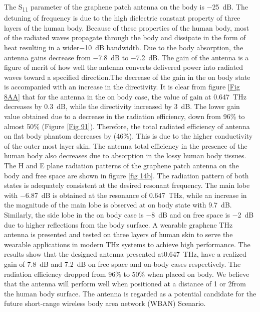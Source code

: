 \documentclass[12pt]{suhbook}
\begin{document}
The \si{S_{11}} parameter of the graphene patch antenna on the body is \SI{-25}{\deci\bel}. The detuning of frequency is due to the high dielectric constant property of three layers of the human body. Because of these properties of the human body, most of the radiated waves propagate through the body and dissipate in the form of heat resulting in a wider\SI{-10}{\deci\bel} bandwidth. Due to the body absorption, the antenna gains decrease from \SI{-7.8}{\deci\bel}  to \SI{-7.2}{\deci\bel}. The gain of the antenna is a figure of merit of how well the antenna converts delivered power into radiated waves toward a specified direction.The decrease of the gain in the on body state is accompanied with an increase in the directivity. It is clear from figure \ref{Fig 8AA}  that for the antenna in the on body case, the value of gain at \SI{0.647}{\THz} decreases by \SI{0.3}{\deci\bel}, while the directivity increased by \SI{3}{\deci\bel}. The lower gain value obtained due to a decrease in the radiation efficiency, down from 96\% to almost 50\% (Figure \ref{Fig 91}). Therefore, the total radiated efficiency of antenna on flat body phantom decreases by (46\%). This is due to the higher conductivity of the outer most layer skin. The antenna total efficiency in the presence of the human body also decreases due to absorption in the lossy human body tissues. 
\\The H and E plane radiation patterns of the graphene patch antenna on the body and free space are shown in figure \ref{fig 14b}. The radiation pattern of both states is adequately consistent at the desired resonant frequency. The main lobe with \SI{-6.87}{\deci\bel} is obtained at the resonance of \SI{0.647}{\THz}, while an increase in the magnitude of the main lobe is observed at on body state with \SI{9.7}{\deci\bel}. Similarly, the side lobe in the on body case is \SI{-8 }{\deci\bel} and on free space is \SI{-2 }{\deci\bel}  due to higher reflections from the body surface. A wearable graphene THz antenna is presented and tested on three layers of human skin to serve the wearable applications in modern THz systems to achieve high performance. The results show that the designed antenna presented at\SI{0.647}{\THz}, have a realized gain of \SI{7.8 }{\deci\bel} and \SI{7.2 }{\deci\bel} on free space and on-body cases respectively. The radiation efficiency dropped from 96\% to 50\% when placed on body. We believe that the antenna will perform well when positioned at a distance of \si{1} or 2\mm from the human body surface. The antenna is regarded as a potential candidate for the future short-range wireless body area network (WBAN) Scenario.
\end{document}
